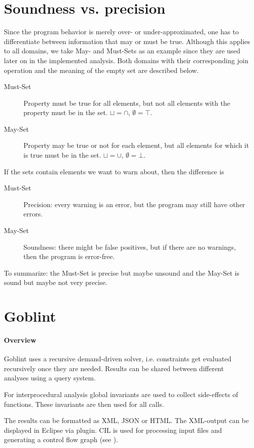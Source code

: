 \section{Soundness vs. precision}
Since the program behavior is merely over- or under-approximated, one has to differentiate between information that may or must be true. Although this applies to all domains, we take May- and Must-Sets as an example since they are used later on in the implemented analysis. Both domains with their corresponding join operation and the meaning of the empty set are described below.
\begin{description}
\item[Must-Set] Property must be true for all elements, but not all elements with the property must be in the set. $\sqcup = \cap$, $\emptyset = \top$.
\item[May-Set] Property may be true or not for each element, but all elements for which  it is true must be in the set. $\sqcup = \cup$, $\emptyset = \bot$.
\end{description}
If the sets contain elements we want to warn about, then the difference is
\begin{description}
\item[Must-Set] Precision: every warning is an error, but the program may still have other errors.
\item[May-Set] Soundness: there might be false positives, but if there are no warnings, then the program is error-free.
\end{description}
To summarize: the Must-Set is precise but maybe unsound and the May-Set is sound but maybe not very precise.


\section{Goblint}
\paragraph*{Overview}
Goblint uses a recursive demand-driven solver, i.e. constraints get evaluated recursively once they are needed. Results can be shared between different analyses using a query system.

For interprocedural analysis global invariants are used to collect side-effects of functions. These invariants are then used for all calls.

The results can be formatted as XML, JSON or HTML. The XML-output can be displayed in Eclipse via plugin. CIL is used for processing input files and generating a control flow graph (see ).

